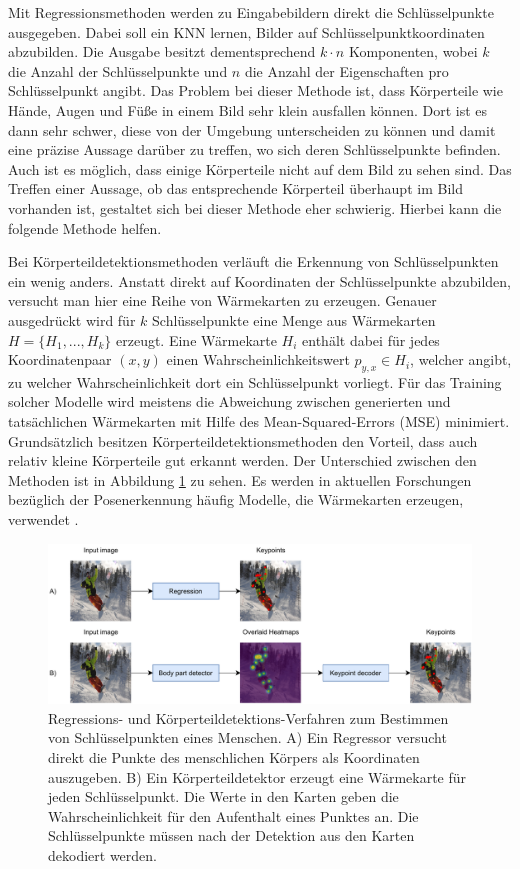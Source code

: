 Mit Regressionsmethoden werden zu Eingabebildern direkt die Schlüsselpunkte
ausgegeben. Dabei soll ein KNN lernen, Bilder auf Schlüsselpunktkoordinaten
abzubilden. Die Ausgabe besitzt dementsprechend $k \cdot n$ Komponenten, wobei
$k$ die Anzahl der Schlüsselpunkte und $n$ die Anzahl der Eigenschaften pro
Schlüsselpunkt angibt. Das Problem bei dieser Methode ist, dass Körperteile wie
Hände, Augen und Füße in einem Bild sehr klein ausfallen können. Dort ist es
dann sehr schwer, diese von der Umgebung unterscheiden zu können und damit eine
präzise Aussage darüber zu treffen, wo sich deren Schlüsselpunkte befinden.
Auch ist es möglich, dass einige Körperteile nicht auf dem Bild zu sehen sind.
Das Treffen einer Aussage, ob das entsprechende Körperteil überhaupt im Bild
vorhanden ist, gestaltet sich bei dieser Methode eher schwierig. Hierbei kann
die folgende Methode helfen.

Bei Körperteildetektionsmethoden verläuft die Erkennung von Schlüsselpunkten ein
wenig anders. Anstatt direkt auf Koordinaten der Schlüsselpunkte abzubilden,
versucht man hier eine Reihe von Wärmekarten zu erzeugen. Genauer ausgedrückt
wird für $k$ Schlüsselpunkte eine Menge aus Wärmekarten $H = \{H_1, ..., H_k\}$
erzeugt. Eine Wärmekarte $H_i$ enthält dabei für jedes Koordinatenpaar $(x, y)$
einen Wahrscheinlichkeitswert $p_{y, x} \in H_i$, welcher angibt, zu welcher
Wahrscheinlichkeit dort ein Schlüsselpunkt vorliegt.  Für das Training solcher
Modelle wird meistens die Abweichung zwischen generierten und tatsächlichen
Wärmekarten mit Hilfe des Mean-Squared-Errors (MSE) minimiert. Grund\-sätz\-lich
besitzen Körperteildetektionsmethoden den Vorteil, dass auch relativ kleine
Körperteile gut erkannt werden. Der Unterschied zwischen den Methoden ist in
Abbildung \ref{fig:pose-detection} zu sehen. Es werden in aktuellen Forschungen
bezüglich der Posenerkennung häufig Modelle, die Wärmekarten erzeugen, verwendet
\cite{zheng2021deep}.

\begin{figure}
    \includegraphics[width=\textwidth]{images/pose_detection.pdf}
    \caption{Regressions- und Körperteildetektions-Verfahren
    zum Be\-stim\-men von Schlüs\-sel\-punk\-ten eines Menschen. A) Ein Regressor
    versucht direkt die Punkte des menschlichen Körpers als Koordinaten
    auszugeben. B) Ein Körper\-teil\-detektor erzeugt eine Wärmekarte für jeden
    Schlüsselpunkt. Die Werte in den Karten geben die Wahrscheinlichkeit für den
    Aufenthalt eines Punktes an. Die Schlüsselpunkte müssen nach der Detektion aus den Karten dekodiert werden.}
    \label{fig:pose-detection}
\end{figure}

